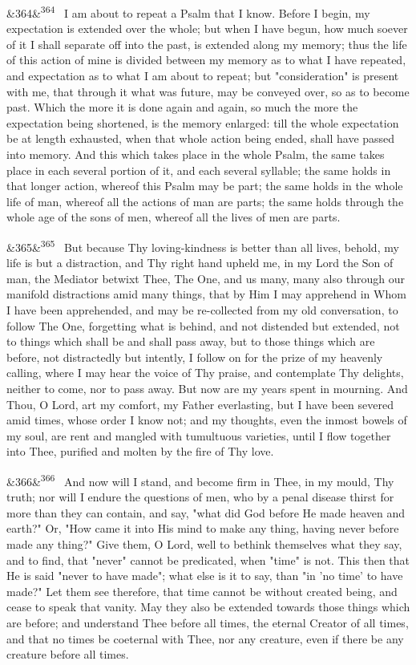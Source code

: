 \documentclass[12pt]{article}
\newcommand{\para}[1][]{\par\noindent\ifx&#1&\else\textsuperscript{\footnotesize #1}~\fi}
\begin{document}
\para[364] I am about to repeat a Psalm that I know. Before I begin, my expectation is extended over the whole; but when I have begun, how much soever of it I shall separate off into the past, is extended along my memory; thus the life of this action of mine is divided between my memory as to what I have repeated, and expectation as to what I am about to repeat; but "consideration" is present with me, that through it what was future, may be conveyed over, so as to become past. Which the more it is done again and again, so much the more the expectation being shortened, is the memory enlarged: till the whole expectation be at length exhausted, when that whole action being ended, shall have passed into memory. And this which takes place in the whole Psalm, the same takes place in each several portion of it, and each several syllable; the same holds in that longer action, whereof this Psalm may be part; the same holds in the whole life of man, whereof all the actions of man are parts; the same holds through the whole age of the sons of men, whereof all the lives of men are parts.

\para[365] But because Thy loving-kindness is better than all lives, behold, my life is but a distraction, and Thy right hand upheld me, in my Lord the Son of man, the Mediator betwixt Thee, The One, and us many, many also through our manifold distractions amid many things, that by Him I may apprehend in Whom I have been apprehended, and may be re-collected from my old conversation, to follow The One, forgetting what is behind, and not distended but extended, not to things which shall be and shall pass away, but to those things which are before, not distractedly but intently, I follow on for the prize of my heavenly calling, where I may hear the voice of Thy praise, and contemplate Thy delights, neither to come, nor to pass away. But now are my years spent in mourning. And Thou, O Lord, art my comfort, my Father everlasting, but I have been severed amid times, whose order I know not; and my thoughts, even the inmost bowels of my soul, are rent and mangled with tumultuous varieties, until I flow together into Thee, purified and molten by the fire of Thy love.

\para[366] And now will I stand, and become firm in Thee, in my mould, Thy truth; nor will I endure the questions of men, who by a penal disease thirst for more than they can contain, and say, "what did God before He made heaven and earth?" Or, "How came it into His mind to make any thing, having never before made any thing?" Give them, O Lord, well to bethink themselves what they say, and to find, that "never" cannot be predicated, when "time" is not. This then that He is said "never to have made"; what else is it to say, than "in 'no time' to have made?" Let them see therefore, that time cannot be without created being, and cease to speak that vanity. May they also be extended towards those things which are before; and understand Thee before all times, the eternal Creator of all times, and that no times be coeternal with Thee, nor any creature, even if there be any creature before all times.
\end{document}
